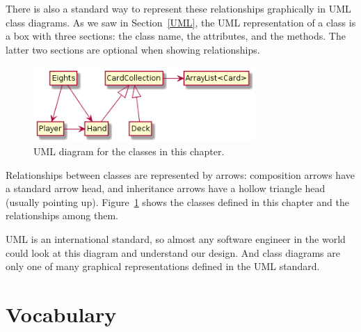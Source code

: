 
There is also a standard way to represent these relationships graphically in UML class diagrams.
As we saw in Section~\ref{UML}, the UML representation of a class is a box with three sections: the class name, the attributes, and the methods.
The latter two sections are optional when showing relationships.


\begin{figure}[!ht]
\begin{center}
\includegraphics[width=0.75\textwidth]{figs/uml1.png}
\caption{UML diagram for the classes in this chapter.}
\label{fig.uml1}
\end{center}
\end{figure}

Relationships between classes are represented by arrows: composition arrows have a standard arrow head, and inheritance arrows have a hollow triangle head (usually pointing up).
Figure~\ref{fig.uml1} shows the classes defined in this chapter and the relationships among them.

UML is an international standard, so almost any software engineer in the world could look at this diagram and understand our design.
And class diagrams are only one of many graphical representations defined in the UML standard.


\section{Vocabulary}

